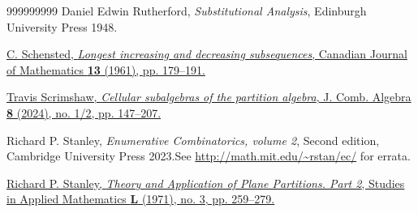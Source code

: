 \documentclass[numbers=enddot,12pt,final,onecolumn,notitlepage]{scrartcl}%
\numberwithin{exer}{subsection}
\theoremstyle{definition}
\begin{document}
\begin{thebibliography}{999999999}
Daniel Edwin Rutherford, \textit{Substitutional
Analysis}, Edinburgh University Press 1948.

\href{https://doi.org/10.4153/CJM-1961-015-3}{C.
Schensted, \textit{Longest increasing and decreasing subsequences}, Canadian
Journal of Mathematics \textbf{13} (1961), pp. 179--191.}

\href{https://doi.org/10.4171/jca/84}{Travis
Scrimshaw, \textit{Cellular subalgebras of the partition algebra}, J. Comb.
Algebra \textbf{8} (2024), no. 1/2, pp. 147--207.}

Richard P. Stanley, \textit{Enumerative
Combinatorics, volume 2}, Second edition, Cambridge University Press
2023.\newline See \url{http://math.mit.edu/~rstan/ec/} for errata.

%
\href{https://math.mit.edu/~rstan/pubs/pubfiles/12-2.pdf}{Richard P. Stanley,
\textit{Theory and Application of Plane Partitions. Part 2}, Studies in
Applied Mathematics \textbf{L} (1971), no. 3, pp. 259--279.}
\end{thebibliography}
\end{document}
